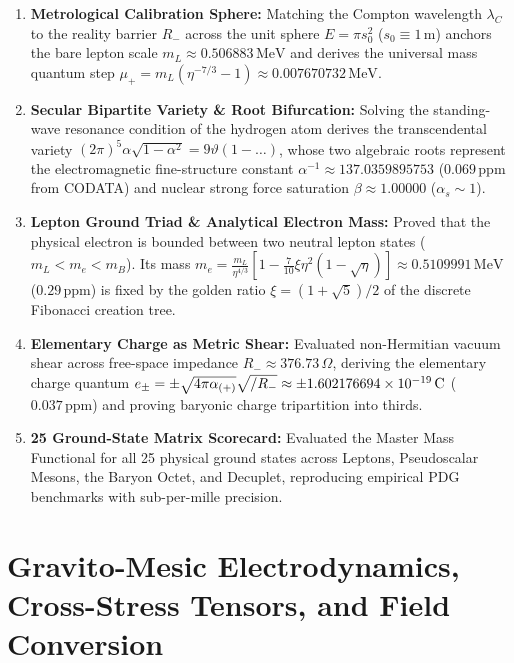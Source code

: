 \documentclass[
    12pt,
    a4paper,
    headings=normal,
    twoside=false,
    open=any,
    parskip=half
]{scrbook}
\let\hbar\relax
\begin{document}
\begin{tcolorbox}[colback=maincolor!3!white, colframe=maincolor!80!black, title={\textbf{Grand Synthesis of Chapter 5}}]
\begin{enumerate}[leftmargin=1.5em, itemsep=4pt]
    \item \textbf{Metrological Calibration Sphere:} Matching the Compton wavelength $\lambda_C$ to the reality barrier $R_-$ across the unit sphere $E = \pi s_0^2$ ($s_0 \equiv 1\,\text{m}$) anchors the bare lepton scale $m_L \approx 0.506883\,\text{MeV}$ and derives the universal mass quantum step $\mu_+ = m_L(\eta^{-7/3} - 1) \approx 0.007670732\,\text{MeV}$.
    \item \textbf{Secular Bipartite Variety \& Root Bifurcation:} Solving the standing-wave resonance condition of the hydrogen atom derives the transcendental variety $(2\pi)^5\alpha\sqrt{1-\alpha^2} = 9\vartheta(1 - \dots)$, whose two algebraic roots represent the electromagnetic fine-structure constant $\alpha^{-1} \approx 137.0359895753$ ($0.069\,\text{ppm}$ from CODATA) and nuclear strong force saturation $\beta \approx 1.00000$ ($\alpha_s \sim 1$).
    \item \textbf{Lepton Ground Triad \& Analytical Electron Mass:} Proved that the physical electron is bounded between two neutral lepton states ($m_L < m_e < m_B$). Its mass $m_e = \frac{m_L}{\eta^{4/3}}[1 - \frac{7}{10}\xi\eta^2(1-\sqrt{\eta})] \approx 0.5109991\,\text{MeV}$ ($0.29\,\text{ppm}$) is fixed by the golden ratio $\xi = (1+\sqrt{5})/2$ of the discrete Fibonacci creation tree.
    \item \textbf{Elementary Charge as Metric Shear:} Evaluated non-Hermitian vacuum shear across free-space impedance $R_- \approx 376.73\,\Omega$, deriving the elementary charge quantum $e_\pm = \pm \sqrt{4\pi\alpha_{(+)}}\sqrt{\hbar/R_-} \approx \pm 1.602176694 \times 10^{-19}\,\text{C}$ ($0.037\,\text{ppm}$) and proving baryonic charge tripartition into thirds.
    \item \textbf{25 Ground-State Matrix Scorecard:} Evaluated the Master Mass Functional for all 25 physical ground states across Leptons, Pseudoscalar Mesons, the Baryon Octet, and Decuplet, reproducing empirical PDG benchmarks with sub-per-mille precision.
\end{enumerate}
\end{tcolorbox}%
\chapter{Gravito-Mesic Electrodynamics, Cross-Stress Tensors, and Field Conversion}
\label{chap:ch6_expanded}
\end{document}
